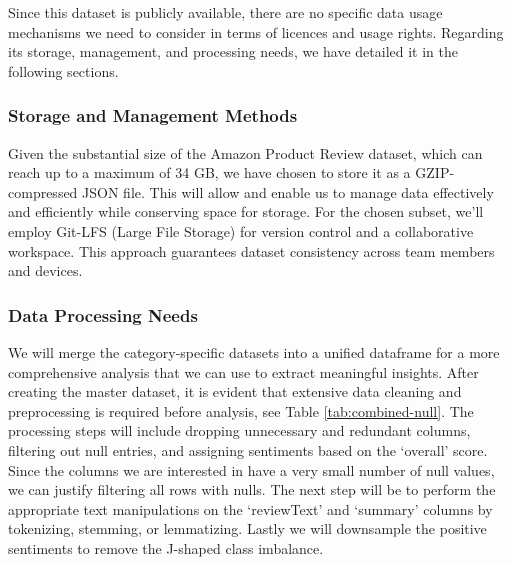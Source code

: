 \documentclass[stu,12pt,floatsintext]{apa7}
\begin{document}
Since this dataset is publicly available, there are no specific data usage mechanisms we need to consider in terms of licences and usage rights. Regarding its storage, management, and processing needs, we have detailed it in the following sections.

\subsubsection{Storage and Management Methods}
Given the substantial size of the Amazon Product Review dataset, which can reach up to a maximum of 34 GB, we have chosen to store it as a GZIP-compressed JSON file. This will allow and enable us to manage data effectively and efficiently while conserving space for storage. For the chosen subset, we'll employ Git-LFS (Large File Storage) for version control and a collaborative workspace. This approach guarantees dataset consistency across team members and devices.

\subsubsection{Data Processing Needs}
We will merge the category-specific datasets into a unified dataframe for a more comprehensive analysis that we can use to extract meaningful insights. After creating the master dataset, it is evident that extensive data cleaning and preprocessing is required before analysis, see Table \ref{tab:combined-null}. The processing steps will include dropping unnecessary and redundant columns, filtering out null entries, and assigning sentiments based on the `overall' score. Since the columns we are interested in have a very small number of null values, we can justify filtering all rows with nulls. The next step will be to perform the appropriate text manipulations on the `reviewText' and `summary' columns by tokenizing, stemming, or lemmatizing. Lastly we will downsample the positive sentiments to remove the J-shaped class imbalance.
\end{document}
